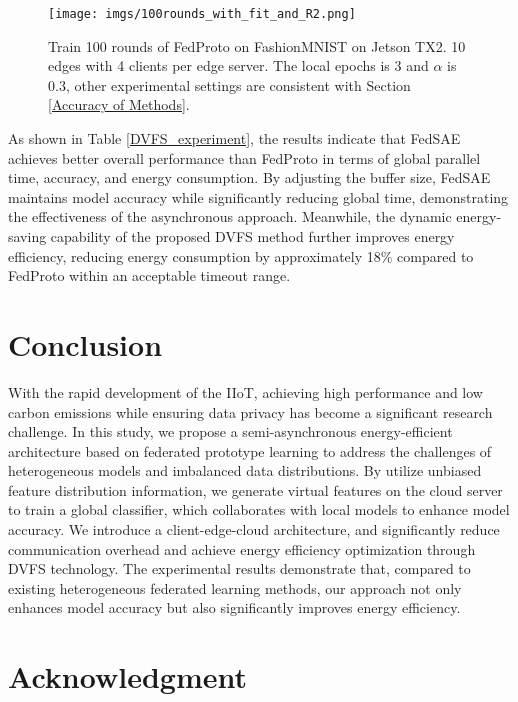 \documentclass[journal]{IEEEtran}
\begin{document}
\begin{figure}[htbp]
  \centering
  \texttt{[image: imgs/100rounds\_with\_fit\_and\_R2.png]}
  \caption{Train 100 rounds of FedProto on FashionMNIST on Jetson TX2. 10 edges with 4 clients per edge server. The local epochs is 3 and $\alpha$ is 0.3, other experimental settings are consistent with Section \ref{Accuracy of Methods}.}
  \label{100rounds_with_fit_and_R2}
\end{figure}


As shown in Table \ref{DVFS_experiment}, the results indicate that FedSAE achieves better overall performance than FedProto in terms of global parallel time, accuracy, and energy consumption. By adjusting the buffer size, FedSAE maintains model accuracy while significantly reducing global time, demonstrating the effectiveness of the asynchronous approach. Meanwhile, the dynamic energy-saving capability of the proposed DVFS method further improves energy efficiency, reducing energy consumption by approximately 18\% compared to FedProto within an acceptable timeout range.


\section{Conclusion}
With the rapid development of the IIoT, achieving high performance and low carbon emissions while ensuring data privacy has become a significant research challenge. In this study, we propose a semi-asynchronous energy-efficient architecture based on federated prototype learning to address the challenges of heterogeneous models and imbalanced data distributions. By utilize unbiased feature distribution information, we generate virtual features on the cloud server to train a global classifier, which collaborates with local models to enhance model accuracy. We introduce a client-edge-cloud architecture, and significantly reduce communication overhead and achieve energy efficiency optimization through DVFS technology. The experimental results demonstrate that, compared to existing heterogeneous federated learning methods, our approach not only enhances model accuracy but also significantly improves energy efficiency.



\section*{Acknowledgment}
\end{document}
